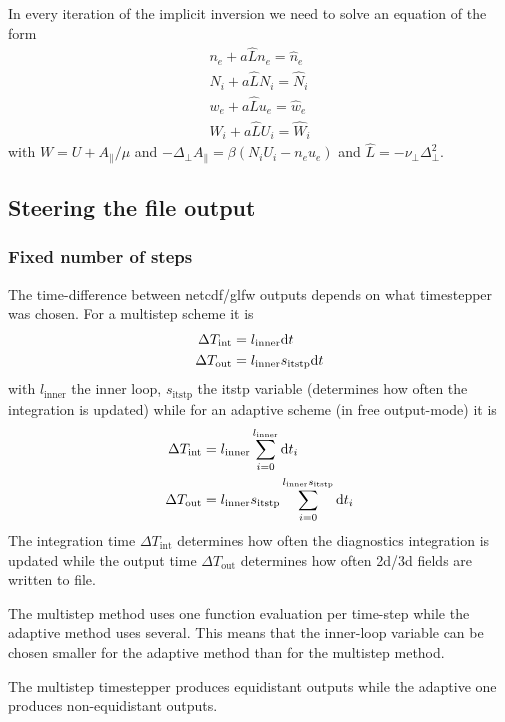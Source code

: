  In every iteration of the implicit inversion we need to solve an equation of the form
 \begin{align}
     n_e + a \hat L n_e = \hat n_e \\
     N_i + a \hat L N_i = \hat N_i \\
     w_e + a \hat L u_e = \hat w_e \\
     W_i + a \hat L U_i = \hat W_i
 \end{align}
 with $W=U+A_\parallel/\mu$ and $-\Delta_\perp A_\parallel = \beta (N_i U_i -n_e u_e)$
     and $\hat L = -\nu_\perp \Delta_\perp^2$.
%

\subsection{Steering the file output} \label{sec:output}
\subsubsection{ Fixed number of steps}
The time-difference between netcdf/glfw outputs depends on what timestepper was
chosen.  For a multistep scheme it is
\begin{align}
    \Delta T_\text{int} &= l_\text{inner} \mathrm{d} t \\
    \Delta T_\text{out} &= l_\text{inner}s_\text{itstp} \mathrm{d} t
\end{align}
with $l_\text{inner}$ the inner loop, $s_\text{itstp}$ the itstp variable (determines how often the integration
is updated)
while for an adaptive scheme (in free output-mode) it is
\begin{align}
    \Delta T_\text{int} &= l_\text{inner} \sum_{i=0}^{l_\text{inner}} \mathrm{d} t_i \\
    \Delta T_\text{out} &= l_\text{inner}s_\text{itstp}\sum_{i=0}^{l_\text{inner}s_\text{itstp}} \mathrm{d} t_i
\end{align}
The integration time $\Delta T_\text{int}$ determines how often the diagnostics integration is updated
while the output time $\Delta T_\text{out}$  determines how often 2d/3d fields are written to file.
\begin{tcolorbox}[title=Note]
    The multistep method uses one function evaluation per time-step while the
    adaptive method uses several. This means that the inner-loop variable can
    be chosen smaller for the adaptive method than for the multistep method.
\end{tcolorbox}
The multistep timestepper produces equidistant outputs while the adaptive one
produces non-equidistant outputs.
